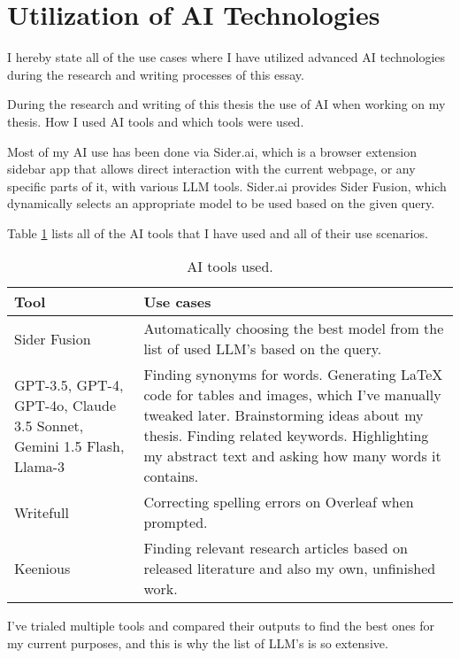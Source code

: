 



\chapter*{Utilization of AI Technologies\label{appendix:declaration}}

I hereby state all of the use cases where I have utilized advanced AI technologies during the research and writing processes of this essay.

During the research and writing of this thesis the use of AI when working on my thesis. How I used AI tools and which tools were used.

Most of my AI use has been done via Sider.ai, which is a browser extension sidebar app that allows direct interaction with the current webpage, or any specific parts of it, with various LLM tools. Sider.ai provides Sider Fusion, which dynamically selects an appropriate model to be used based on the given query.

Table \ref{tab:declaration} lists all of the AI tools that I have used and all of their use scenarios.

\begin{table}[h]
  \centering
  \begin{tabular}{m{5cm}m{8cm}}
    \hline
    \textbf{Tool} & \textbf{Use cases} \\
    \hline
    Sider Fusion & Automatically choosing the best model from the list of used LLM's based on the query. \\
    \hline
    GPT-3.5, GPT-4, GPT-4o, Claude 3.5 Sonnet, Gemini 1.5 Flash, Llama-3 & Finding synonyms for words. Generating LaTeX code for tables and images, which I’ve manually tweaked later. Brainstorming ideas about my thesis. Finding related keywords. Highlighting my abstract text and asking how many words it contains. \\
    \hline
    Writefull & Correcting spelling errors on Overleaf when prompted. \\
    \hline
    Keenious & Finding relevant research articles based on released literature and also my own, unfinished work. \\
    \hline
  \end{tabular}
  \caption{AI tools used.}
  \label{tab:declaration}
\end{table}

I've trialed multiple tools and compared their outputs to find the best ones for my current purposes, and this is why the list of LLM's is so extensive.